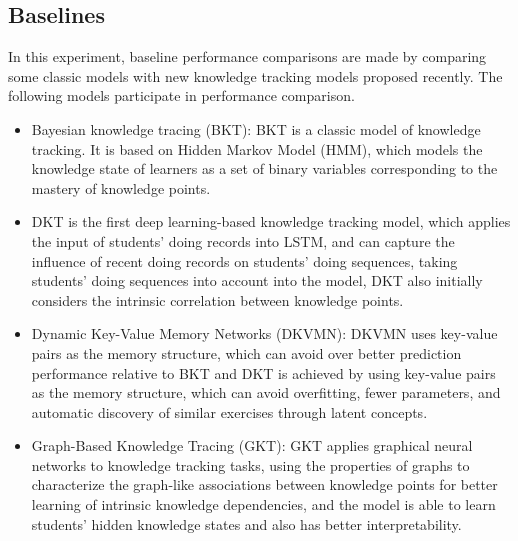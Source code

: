 \subsection{Baselines}
In this experiment, baseline performance comparisons are made by comparing some classic models with new knowledge tracking models proposed recently. The following models participate in performance comparison.
\begin{itemize}
	\item Bayesian knowledge tracing (BKT)\cite{yudelson2013individualized}: BKT is a classic model of knowledge tracking. It is based on Hidden Markov Model (HMM), which models the knowledge state of learners as a set of binary variables corresponding to the mastery of knowledge points.
	\item DKT is the first deep learning-based knowledge tracking model, which applies the input of students' doing records into LSTM, and can capture the influence of recent doing records on students' doing sequences, taking students' doing sequences into account into the model, DKT also initially considers the intrinsic correlation between knowledge points.
	\item Dynamic Key-Value Memory Networks (DKVMN)\cite{zhang2017dynamic}: DKVMN uses key-value pairs as the memory structure, which can avoid over better prediction performance relative to BKT and DKT is achieved by using key-value pairs as the memory structure, which can avoid overfitting, fewer parameters, and automatic discovery of similar exercises through latent concepts.
	\item Graph-Based Knowledge Tracing (GKT)\cite{nakagawa2019graph}: GKT applies graphical neural networks to knowledge tracking tasks, using the properties of graphs to characterize the graph-like associations between knowledge points for better learning of intrinsic knowledge dependencies, and the model is able to learn students' hidden knowledge states and also has better interpretability.
\end{itemize}

